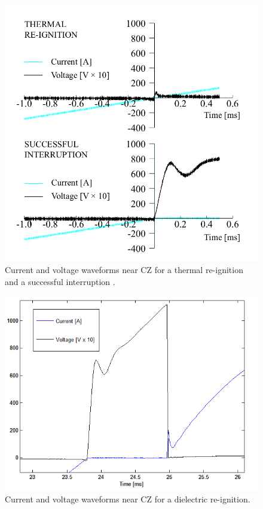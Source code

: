 \documentclass[10pt,b5paper,twoside]{article}
\begin{document}
\begin{figure}[H]
\centering
\includegraphics[scale=0.32]{Bilder/Results/differentInterruptions.png}
\caption{Current and voltage waveforms near CZ for a thermal re-ignition and a successful interruption \cite{bib:AFIMVLBA}.} \label{fig:CurrentAndVoltageWaveform}
\end{figure}

\begin{figure}[H]
\centering
\includegraphics[scale=0.7]{Bilder/Results/DRplot2.png}
\caption{Current and voltage waveforms near CZ for a dielectric re-ignition.} \label{fig:CurrentAndVoltageDRWaveform}
\end{figure}
\end{document}
